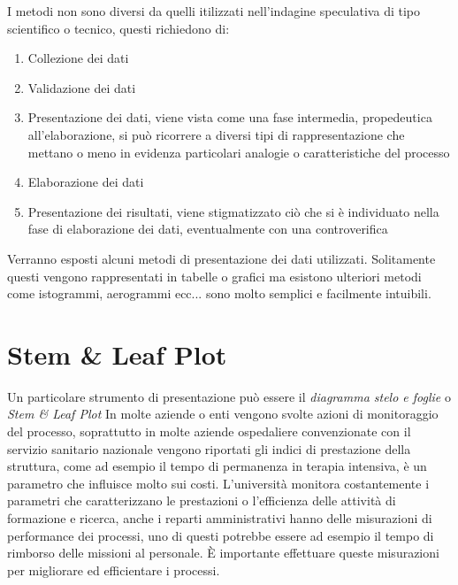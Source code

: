 \newpage
I metodi non sono diversi da quelli itilizzati nell'indagine speculativa di 
tipo scientifico o tecnico, questi richiedono di:
\begin{enumerate}
    \item Collezione dei dati
    \item Validazione dei dati
    \item Presentazione dei dati, viene vista come una fase intermedia, 
    propedeutica all'elaborazione, si può ricorrere a diversi tipi di 
    rappresentazione che mettano o meno in evidenza particolari analogie o 
    caratteristiche del processo
    \item Elaborazione dei dati
    \item Presentazione dei risultati, viene stigmatizzato ciò che si è 
    individuato nella fase di elaborazione dei dati, eventualmente con una 
    controverifica
\end{enumerate}

Verranno esposti alcuni metodi di presentazione dei dati utilizzati.
Solitamente questi vengono rappresentati in tabelle o grafici ma esistono 
ulteriori metodi come istogrammi, aerogrammi ecc... sono molto semplici e 
facilmente intuibili.

\section{Stem \& Leaf Plot}
Un particolare strumento di presentazione può essere il \textit{diagramma stelo 
e foglie} o \textit{Stem \& Leaf Plot}
In molte aziende o enti vengono svolte azioni di monitoraggio del processo, 
soprattutto in molte aziende ospedaliere convenzionate con il servizio 
sanitario nazionale vengono riportati gli indici di prestazione della 
struttura, come ad esempio il tempo di permanenza in terapia intensiva, è un 
parametro che influisce molto sui costi.
L'università monitora costantemente i parametri che caratterizzano le 
prestazioni o l'efficienza delle attività di formazione e ricerca, anche i 
reparti amministrativi hanno delle misurazioni di performance dei processi, uno 
di questi potrebbe essere ad esempio il tempo di rimborso delle missioni al 
personale.
È importante effettuare queste misurazioni per migliorare ed efficientare i 
processi.

